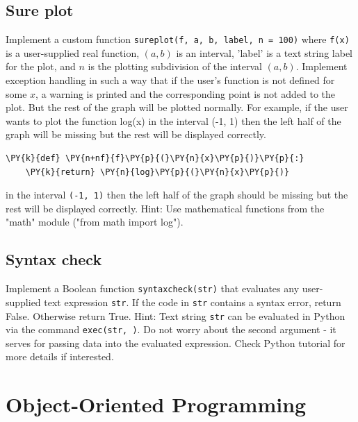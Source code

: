 
\subsection{Sure plot}

Implement a custom function {\tt sureplot(f, a, b, label, n = 100)} where {\tt f(x)} is a user-supplied real function, 
$(a, b)$ is an interval, 'label' is a text string label for the plot, and $n$ is the plotting subdivision of the interval $(a, b)$. 
Implement exception handling in such a way that if the user's function is not defined for some $x$, a warning is printed and the 
corresponding point is not added to the plot. But the rest of the graph will be plotted normally. For example, if the user wants 
to plot the function log(x) in the interval (-1, 1) then the left half of the graph will be missing but the rest will be displayed correctly.
\begin{Verbatim}[commandchars=\\\{\}]
\PY{k}{def} \PY{n+nf}{f}\PY{p}{(}\PY{n}{x}\PY{p}{)}\PY{p}{:}
    \PY{k}{return} \PY{n}{log}\PY{p}{(}\PY{n}{x}\PY{p}{)}
\end{Verbatim}
in the interval {\tt (-1, 1)} then the left half of the graph should be missing but the rest 
will be displayed correctly. Hint: Use mathematical functions from the "math" module ("from math 
import log").


\subsection{Syntax check}

Implement a Boolean function {\tt syntaxcheck(str)} that evaluates any user-supplied text expression {\tt str}. If the code in {\tt str} contains a syntax error, return False. Otherwise return True. Hint: Text string {\tt str} can be evaluated in Python via the command {\tt exec(str, {})}. Do not worry about the second argument - it serves for passing data into the evaluated expression. Check Python tutorial for more details if interested.


\section{Object-Oriented Programming}

